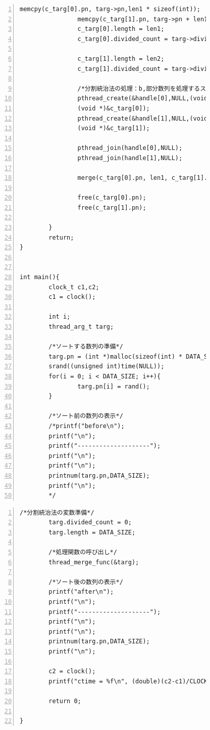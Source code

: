 \documentclass[11pt,a4paper]{jsarticle}
\begin{document}
\begin{figure}[htbp]
 \begin{center}
  \begin{Verbatim}[frame=single,baselinestretch=1,fontsize=\footnotesize,numbers=left]
				memcpy(c_targ[0].pn, targ->pn,len1 * sizeof(int));
				memcpy(c_targ[1].pn, targ->pn + len1, len2 * sizeof(int));
				c_targ[0].length = len1;
				c_targ[0].divided_count = targ->divided_count + 1;

				c_targ[1].length = len2;
                c_targ[1].divided_count = targ->divided_count + 1;

				/*分割統治法の処理：b,部分数列を処理するスレッドの生成*/
				pthread_create(&handle[0],NULL,(void *)thread_merge_func,
				(void *)&c_targ[0]);
				pthread_create(&handle[1],NULL,(void *)thread_merge_func,
				(void *)&c_targ[1]);

				pthread_join(handle[0],NULL);
				pthread_join(handle[1],NULL);

				merge(c_targ[0].pn, len1, c_targ[1].pn,len2,targ->pn);

				free(c_targ[0].pn);
				free(c_targ[1].pn);

		}
		return;
}


int main(){
		clock_t c1,c2;
   		c1 = clock();
   		
		int i;
		thread_arg_t targ;

        /*ソートする数列の準備*/
		targ.pn = (int *)malloc(sizeof(int) * DATA_SIZE);
		srand((unsigned int)time(NULL));
		for(i = 0; i < DATA_SIZE; i++){
				targ.pn[i] = rand();
		}

		/*ソート前の数列の表示*/
		/*printf("before\n");
		printf("\n");
		printf("--------------------");
		printf("\n");
		printf("\n");
		printnum(targ.pn,DATA_SIZE);
		printf("\n");
		*/
  \end{Verbatim}
 \end{center}
\end{figure}
\begin{figure}[htbp]
 \begin{center}
  \begin{Verbatim}[frame=single,baselinestretch=1,fontsize=\footnotesize,numbers=left]
		/*分割統治法の変数準備*/
		targ.divided_count = 0;
		targ.length = DATA_SIZE;

		/*処理関数の呼び出し*/
		thread_merge_func(&targ);

		/*ソート後の数列の表示*/
		printf("after\n");
		printf("\n");
		printf("--------------------");
		printf("\n");
		printf("\n");
		printnum(targ.pn,DATA_SIZE);
		printf("\n");
		
		c2 = clock();
    	printf("ctime = %f\n", (double)(c2-c1)/CLOCKS_PER_SEC);

		return 0;
		
}
  \end{Verbatim}
 \end{center}
\end{figure}
\end{document}
